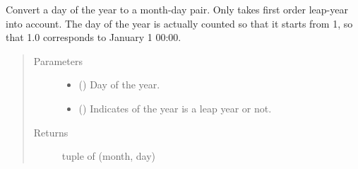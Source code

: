 \documentclass[letterpaper,10pt,english]{sphinxmanual}
\begin{document}
\begin{fulllineitems}
\label{\detokenize{modules/dpt_tools:dpt_tools.yearday_to_monthday}}
Convert a day of the year to a month-day pair.
Only takes first order leap-year into account. The day of the year is actually counted so that it starts from 1, so that 1.0 corresponds to January 1 00:00.
\begin{quote}\begin{description}
\item[{Parameters}] \leavevmode\begin{itemize}
\item {} 
 () \textendash{} Day of the year.

\item {} 
 () \textendash{} Indicates of the year is a leap year or not.

\end{itemize}

\item[{Returns}] \leavevmode
tuple of (month, day)

\end{description}\end{quote}

\begin{quote}

%
\begin{sphinxVerbatim}[commandchars=\\\{\}]
 
 
 
\end{sphinxVerbatim}
\end{quote}

\end{fulllineitems}
\end{document}
